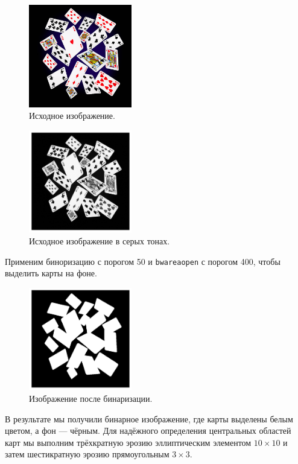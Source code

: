 \documentclass[a4paper,12pt]{article}
\begin{document}
\begin{figure}[H]
    \centering
    \includegraphics[width=0.4\textwidth]{images/cards2.jpg}
    \caption{Исходное изображение.}
\end{figure}
\begin{figure}[H]
    \centering
    \includegraphics[width=0.4\textwidth]{result/2_grayscale.png}
    \caption{Исходное изображение в серых тонах.}
\end{figure}

Применим биноризацию с порогом 50 и \texttt{bwareaopen} с порогом 400, чтобы выделить карты на фоне. 

\begin{figure}[H]
    \centering
    \includegraphics[width=0.4\textwidth]{result/2_bin.png}
    \caption{Изображение после бинаризации.}
\end{figure}

В результате мы получили бинарное изображение, где карты выделены белым цветом, а фон — чёрным. Для надёжного определения центральных областей карт мы выполним трёхкратную эрозию эллиптическим элементом \(10\times10\) и затем шестикратную эрозию прямоугольным \(3\times3\). 
\end{document}
